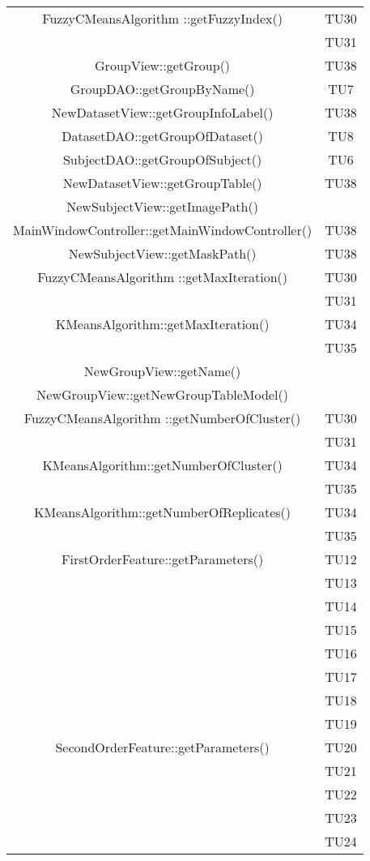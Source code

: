 \begin{center}
\begin{longtable}{|c|c|}
\hline 
FuzzyCMeansAlgorithm ::getFuzzyIndex() & TU30 \\
 & TU31 \\
\hline 
GroupView::getGroup() & TU38 \\
\hline 
GroupDAO::getGroupByName() & TU7 \\
\hline 
NewDatasetView::getGroupInfoLabel() & TU38 \\
\hline 
DatasetDAO::getGroupOfDataset() & TU8 \\
\hline 
SubjectDAO::getGroupOfSubject() & TU6 \\
\hline 
NewDatasetView::getGroupTable() & TU38 \\
\hline 
NewSubjectView::getImagePath() &  \\
\hline 
MainWindowController::getMainWindowController() & TU38 \\
\hline 
NewSubjectView::getMaskPath() & TU38 \\
\hline 
FuzzyCMeansAlgorithm ::getMaxIteration() & TU30 \\
 & TU31 \\
\hline 
KMeansAlgorithm::getMaxIteration() & TU34 \\
 & TU35 \\
\hline 
NewGroupView::getName() &  \\
\hline 
NewGroupView::getNewGroupTableModel() &  \\
\hline 
FuzzyCMeansAlgorithm ::getNumberOfCluster() & TU30 \\
 & TU31 \\
\hline 
KMeansAlgorithm::getNumberOfCluster() & TU34 \\
 & TU35 \\
\hline 
KMeansAlgorithm::getNumberOfReplicates() & TU34 \\
 & TU35 \\
\hline 
FirstOrderFeature::getParameters() & TU12 \\
 & TU13 \\
 & TU14 \\
 & TU15 \\
 & TU16 \\
 & TU17 \\
 & TU18 \\
 & TU19 \\
\hline 
SecondOrderFeature::getParameters() & TU20 \\
 & TU21 \\
 & TU22 \\
 & TU23 \\
 & TU24 \\

\end{longtable}
\end{center}
